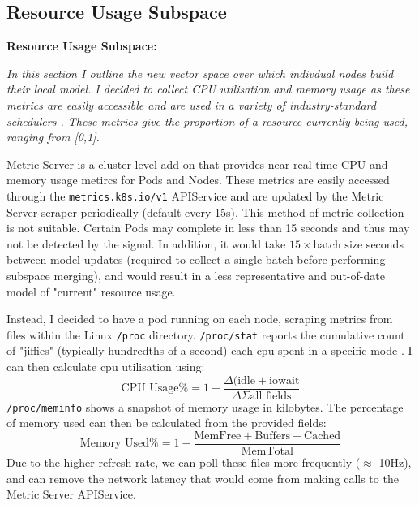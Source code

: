 \subsection{Resource Usage Subspace}
\begin{tcolorbox}[boxsep=0mm,left=2.5mm,right=2.5mm]
    \textbf{Resource Usage Subspace:} {\em In this section I outline the new
    vector space over which indivdual nodes build their local model. I decided
    to collect CPU utilisation and memory usage as these metrics are easily
    accessible and are used in a variety of industry-standard schedulers
    \cite{hadoop2016apache,sahasrabudhe_improved_2015}. These metrics give the
    proportion of a resource currently being used, ranging from [0,1].

    Metric Server is a cluster-level add-on that provides near real-time CPU and
    memory usage metircs for Pods and Nodes. These metrics are easily accessed through
    the \verb|metrics.k8s.io/v1| APIService and are updated by the Metric Server scraper
    periodically (default every 15s). This method of metric collection is not
    suitable. Certain Pods may complete in less than 15 seconds and thus may not
    be detected by the signal. In addition, it would take $15 \times \text{batch size}$
    seconds between model updates (required to collect a single
    batch before performing subspace merging), and would result in a less
    representative and out-of-date model of "current" resource usage.

    Instead, I decided to have a pod running on each node, scraping
    metrics from files within the Linux \verb|/proc| directory.
    \verb|/proc/stat| reports the cumulative count of "jiffies" (typically
    hundredths of a second) each cpu spent in a specific mode \cite{proc_stat5}.
    I can then calculate cpu utilisation using:
    \[ \text{CPU Usage\%} = 1 - \frac{\Delta(\text{idle} +
    \text{iowait}}{\Delta{\Sigma \text{all fields}}} \]
    \verb|/proc/meminfo| shows a snapshot of memory usage in kilobytes. The
    percentage of memory used can then be calculated from the provided fields:
    \[ \text{Memory Used\%} = 1 - \frac{\text{MemFree} +
    \text{Buffers} + \text{Cached}}{\text{MemTotal}}\]
    Due to the higher refresh rate, we can poll these files more frequently
    ($\approx$ 10Hz), and can remove the network latency that would come from
    making calls to the Metric Server APIService.
    }
\end{tcolorbox}

